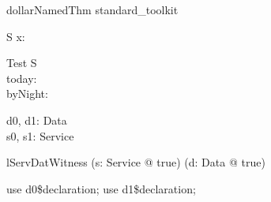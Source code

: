\begin{zsection}
   \SECTION dollarNamedThm \parents standard\_toolkit
\end{zsection}

\begin{schema}{S}
   x: \nat
\end{schema}

\begin{schema}{Test}
   \Delta S \\
   today: \nat \\
   byNight: \nat
\end{schema}



\begin{zed}
\end{zed}

\begin{axdef}
   d0, d1: Data
\\
   s0, s1: Service
\end{axdef}

\begin{theorem}{lServDatWitness}
   (\exists s: Service @ true) \land (\exists d: Data @ true)
\end{theorem}

\begin{zproof}[lServDatWitness]
use d0\$declaration;
use d1\$declaration;
\end{zproof}